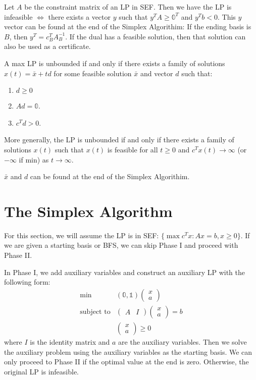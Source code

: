 \documentclass[a4paper]{report}
\newcommand\m[1]{\begin{pmatrix}#1\end{pmatrix}}
\begin{document}
\begin{definition}\label{infeasibility}
  Let $A$ be the constraint matrix of an LP in SEF. Then we have the LP is infeasible $\Longleftrightarrow$ there exists a vector $y$ such that $y^T A \geq \mathbb 0^T$ and $y^T b < 0$. This $y$ vector can be found at the end of the Simplex Algorithim: If the ending basis is $B$, then $y^T = c_B^T A_B^{-1}$. If the dual has a feasible solution, then that solution can also be used as a certificate.
\end{definition}

\begin{definition}\label{unboundedness}
  A max LP is unbounded if and only if there exists a family of solutions $x(t) = \bar x + td$ for some feasible solution $\bar x$ and vector $d$ such that:
  \begin{enumerate}
    \item $d \geq 0$
    \item $Ad = \mathbb 0$.
    \item $c^T d > 0$.
  \end{enumerate}

  More generally, the LP is unbounded if and only if there exists a family of solutions $x(t)$ such that $x(t)$ is feasible for all $t \geq 0$ and $c^Tx(t) \rightarrow \infty$ (or $-\infty$ if min) as $t \rightarrow \infty$.
  
  $\bar x$ and $d$ can be found at the end of the Simplex Algorithim.
\end{definition}

\section{The Simplex Algorithm}
For this section, we will assume the LP is in SEF: $\{\max c^T x : Ax = b, x \geq 0\}$. If we are given a starting basis or BFS, we can skip Phase I and proceed with Phase II. 

\begin{definition}\label{phase:i}
  In Phase I, we add auxiliary variables and construct an auxiliary LP with the following form:
  \begin{equation*}
    \begin{aligned}
      \min & (\mathbb 0, \mathbb 1) \m{x \\ a} \\
      \text{subject to} & \m{A & I} \m{x \\ a} = b \\
      & \m{x \\ a} \geq 0
    \end{aligned}
  \end{equation*}
  where $I$ is the identity matrix and $a$ are the auxiliary variables. Then we solve the auxiliary problem using the auxiliary variables as the starting basis. We can only proceed to Phase II if the optimal value at the end is zero. Otherwise, the original LP is infeasible.
\end{definition}
\end{document}
